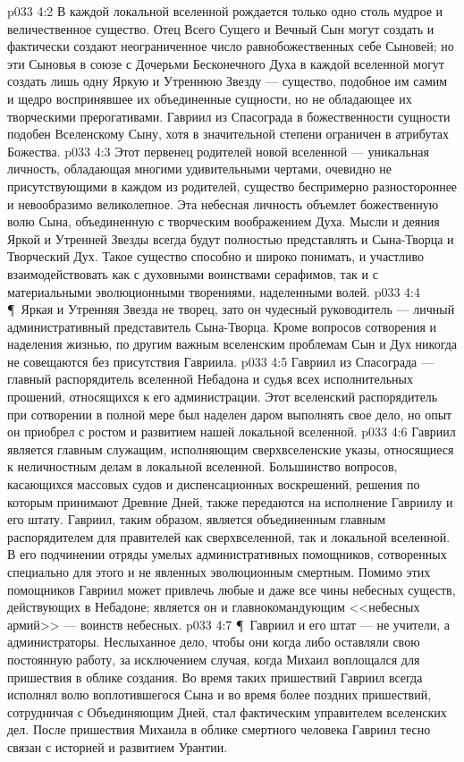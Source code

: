 \vs p033 4:2 В каждой локальной вселенной рождается только одно столь мудрое и величественное существо. Отец Всего Сущего и Вечный Сын могут создать и фактически создают неограниченное число равнобожественных себе Сыновей; но эти Сыновья в союзе с Дочерьми Бесконечного Духа в каждой вселенной могут создать лишь одну Яркую и Утреннюю Звезду --- существо, подобное им самим и щедро воспринявшее их объединенные сущности, но не обладающее их творческими прерогативами. Гавриил из Спасограда в божественности сущности подобен Вселенскому Сыну, хотя в значительной степени ограничен в атрибутах Божества.
\vs p033 4:3 Этот первенец родителей новой вселенной --- уникальная личность, обладающая многими удивительными чертами, очевидно не присутствующими в каждом из родителей, существо беспримерно разностороннее и невообразимо великолепное. Эта небесная личность объемлет божественную волю Сына, объединенную с творческим воображением Духа. Мысли и деяния Яркой и Утренней Звезды всегда будут полностью представлять и Сына\hyp{}Творца и Творческий Дух. Такое существо способно и широко понимать, и участливо взаимодействовать как с духовными воинствами серафимов, так и с материальными эволюционными творениями, наделенными волей.
\vs p033 4:4 \P\ Яркая и Утренняя Звезда не творец, зато он чудесный руководитель --- личный административный представитель Сына\hyp{}Творца. Кроме вопросов сотворения и наделения жизнью, по другим важным вселенским проблемам Сын и Дух никогда не совещаются без присутствия Гавриила.
\vs p033 4:5 Гавриил из Спасограда --- главный распорядитель вселенной Небадона и судья всех исполнительных прошений, относящихся к его администрации. Этот вселенский распорядитель при сотворении в полной мере был наделен даром выполнять свое дело, но опыт он приобрел с ростом и развитием нашей локальной вселенной.
\vs p033 4:6 Гавриил является главным служащим, исполняющим сверхвселенские указы, относящиеся к неличностным делам в локальной вселенной. Большинство вопросов, касающихся массовых судов и диспенсационных воскрешений, решения по которым принимают Древние Дней, также передаются на исполнение Гавриилу и его штату. Гавриил, таким образом, является объединенным главным распорядителем для правителей как сверхвселенной, так и локальной вселенной. В его подчинении отряды умелых административных помощников, сотворенных специально для этого и не явленных эволюционным смертным. Помимо этих помощников Гавриил может привлечь любые и даже все чины небесных существ, действующих в Небадоне; является он и главнокомандующим <<небесных армий>> --- воинств небесных.
\vs p033 4:7 \P\ Гавриил и его штат --- не учители, а администраторы. Неслыханное дело, чтобы они когда либо оставляли свою постоянную работу, за исключением случая, когда Михаил воплощался для пришествия в облике создания. Во время таких пришествий Гавриил всегда исполнял волю воплотившегося Сына и во время более поздних пришествий, сотрудничая с Объединяющим Дней, стал фактическим управителем вселенских дел. После пришествия Михаила в облике смертного человека Гавриил тесно связан с историей и развитием Урантии.
